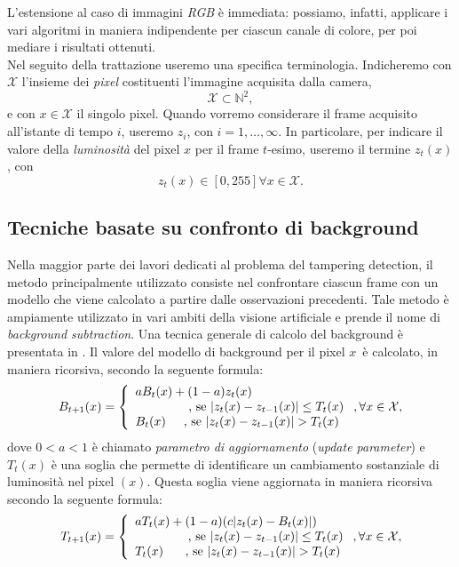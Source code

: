 L'estensione al caso di immagini \textit{RGB} \`e immediata: possiamo, infatti, applicare i vari algoritmi in maniera indipendente per ciascun canale di colore, per poi mediare i risultati ottenuti.\\
Nel seguito della trattazione useremo una specifica terminologia.
Indicheremo con $\mathcal{X}$ l'insieme dei \textit{pixel} costituenti l'immagine acquisita dalla camera,
\[ \mathcal{X} \subset \mathbb{N}^2, \]
e con $x \in \mathcal{X}$ il singolo pixel.
Quando vorremo considerare il frame acquisito all'istante di tempo $i$, useremo $z_i$, con $i=1,\dots , \infty$. 
In particolare, per indicare il valore della \textit{luminosit\`a} del pixel $x$ per il frame $t$-esimo, useremo il termine $z_t(x)$, con 
\[ z_t(x) \in [0, 255] \forall x \in \mathcal{X}. \]


\subsection{Tecniche basate su confronto di background}
\label{background}
Nella maggior parte dei lavori dedicati al problema del tampering detection, il metodo principalmente utilizzato consiste nel confrontare ciascun frame con un modello che viene calcolato a partire dalle osservazioni precedenti.
Tale metodo \`e ampiamente utilizzato in vari ambiti della visione artificiale e prende il nome di \textit{background subtraction}.
Una tecnica generale di calcolo del background \`e presentata in \cite{aksay2007camera}.
Il valore del modello di background per il pixel $x$\ \`e calcolato, in maniera ricorsiva, secondo la seguente formula:
\[
\label{eq:background}
B_{t + 1}(x)=\left\{ \begin{array} {lcl}
aB_t(x)+ (1-a)z_t(x) \\
\mbox{\hspace{1.5cm}, se } |z_t(x) - z_{t-1}(x)|\leq T_t(x) \\
B_t(x) \mbox{\hspace{0.5cm}, se } |z_t(x) - z_{t-1}(x)|>T_t(x)\end{array} \right. , \forall x \in \mathcal{X},
\]
dove $0 < a < 1$ \`e chiamato \textit{parametro di aggiornamento} (\textit{update parameter}) e $T_t(x)$ \`e una soglia che permette di identificare un cambiamento sostanziale di luminosit\`a nel pixel $(x)$. 
 Questa soglia viene aggiornata in maniera ricorsiva secondo la seguente formula:
  \[
  \label{eq:backgroundThreshUpd}
  T_{t + 1}(x)=\left\{ \begin{array} {lcl}
  aT_t(x)+ (1-a)(c |z_t(x) - B_t(x)|) \\
  \mbox{\hspace{1.5cm}, se	}  |z_t(x) - z_{t-1}(x)|\leq T_t(x) \\
  T_t(x) \mbox{	\hspace{0.5cm}, se	}  |z_t(x) - z_{t-1}(x)|>T_t(x) \end{array} \right. ,\forall x \in \mathcal{X},
  \]
